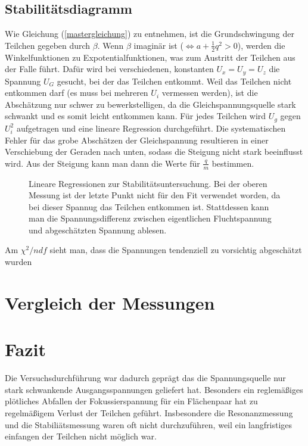 \documentclass[a4paper,12pt]{article}
\begin{document}
\subsection{Stabilitätsdiagramm}
Wie Gleichung (\ref{mastergleichung}) zu entnehmen, ist die Grundschwingung der Teilchen gegeben durch $β$.
Wenn $β$ imaginär ist ($ \Leftrightarrow a + \frac12q^2 >0$), werden die Winkelfunktionen zu Expotentialfunktionen, was zum Austritt der Teilchen aus der Falle führt.
Dafür wird bei verschiedenen, konstanten $U_x = U_y = U_z$ die Spannung $U_G$ gesucht, bei der das Teilchen entkommt.
Weil das Teilchen nicht entkommen darf (es muss bei mehreren $U_i$ vermessen werden), ist die Abschätzung nur schwer zu bewerkstelligen, da die Gleichspannungsquelle stark schwankt und es somit leicht entkommen kann.
Für jedes Teilchen wird $U_g$ gegen $U_i^2$ aufgetragen und eine lineare Regression durchgeführt.
Die systematischen Fehler für das grobe Abschätzen der Gleichspannung resultieren in einer Verschiebung der Geraden nach unten, sodass die Steigung nicht stark beeinflusst wird.
Aus der Steigung kann man dann die Werte für $\frac{q}{m}$ bestimmen.
\begin{figure}[htb]
		\centering
		\caption{Lineare Regressionen zur Stabilitätsuntersuchung.
		Bei der oberen Messung ist der letzte Punkt nicht für den Fit verwendet worden, da bei dieser Spannug das Teilchen entkommen ist.
		Stattdessen kann man die Spannungsdifferenz zwischen eigentlichen Fluchtspannung und abgeschätzten Spannung ablesen.}
\end{figure}
Am $χ^2/ndf$ sieht man, dass die Spannungen tendenziell zu vorsichtig abgeschätzt wurden




\section{Vergleich der Messungen}

\section{Fazit}
Die Versuchsdurchführung war dadurch geprägt das die Spannungsquelle nur stark schwankende Ausgangsspannungen geliefert hat. Besonders ein reglemäßiges plötliches Abfallen der Fokussierspannung für ein 
Flächenpaar hat zu regelmäßigem Verlust der Teilchen geführt. Insbesondere die Resonanzmessung und die Stabiliätsmessung waren oft nicht durchzuführen, weil ein langfristiges einfangen der Teilchen nicht
möglich war.

\end{document}
